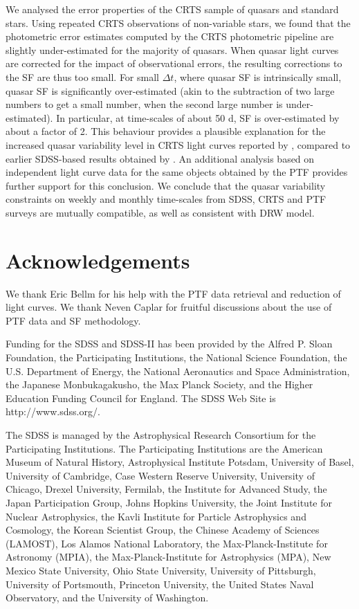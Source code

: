 \documentclass[fleqn,usenatbib]{mnras}
\begin{document}
We analysed the error properties of the CRTS sample of quasars and standard stars. Using 
repeated CRTS observations of non-variable stars, we found that the photometric error estimates 
computed by the CRTS photometric pipeline are slightly under-estimated for the majority of
quasars. When quasar light curves are corrected for the impact of observational errors, the
resulting corrections to the SF are thus too small. For small $\Delta t$, where quasar SF is intrinsically 
small, quasar SF is significantly over-estimated (akin to the subtraction of two large numbers 
to get a small number, when the second large number is under-estimated). In particular, at time-scales of about 50 d, SF is over-estimated by about a factor of 2. This behaviour provides 
a plausible explanation for the increased quasar variability level in CRTS light curves reported 
by \cite{graham2014}, compared to earlier SDSS-based results obtained by \cite{macleod2010}.
An additional analysis based on independent light curve data for the same objects obtained by 
the PTF provides further support for this conclusion. We conclude that
the quasar variability constraints on weekly and monthly time-scales from SDSS, CRTS and PTF 
surveys are mutually compatible, as well as consistent with DRW model. 



\section*{Acknowledgements}

We thank Eric Bellm for his help with the PTF data retrieval and reduction of light curves.  
We thank Neven Caplar for fruitful discussions about the use of PTF data and SF methodology. 

Funding for the SDSS and SDSS-II has been provided by the Alfred P. Sloan Foundation, 
the Participating Institutions, the National Science Foundation, the U.S. Department of 
Energy, the National Aeronautics and Space Administration, the Japanese Monbukagakusho,
the Max Planck Society, and the Higher Education Funding Council for England. The SDSS 
Web Site is http://www.sdss.org/.

The SDSS is managed by the Astrophysical Research Consortium for the Participating Institutions. 
The Participating Institutions are the American Museum of Natural History, Astrophysical Institute 
Potsdam, University of Basel, University of Cambridge, Case Western Reserve University, University
of Chicago, Drexel University, Fermilab, the Institute for Advanced Study, the Japan Participation 
Group, Johns Hopkins University, the Joint Institute for Nuclear Astrophysics, the Kavli Institute for 
Particle Astrophysics and Cosmology, the Korean Scientist Group, the Chinese Academy of Sciences 
(LAMOST), Los Alamos National Laboratory, the Max-Planck-Institute for Astronomy (MPIA), the 
Max-Planck-Institute for Astrophysics (MPA), New Mexico State University, Ohio State University, 
University of Pittsburgh, University of Portsmouth, Princeton University, the United States Naval
Observatory, and the University of Washington. 
\end{document}
